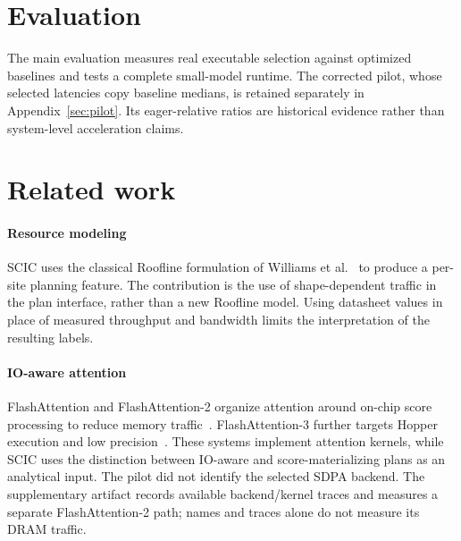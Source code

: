 \documentclass[a4paper,fleqn]{cas-dc}
\begin{document}




\section{Evaluation}
\label{sec:eval}

The main evaluation measures real executable selection against optimized baselines and tests a complete small-model runtime.
The corrected pilot, whose selected latencies copy baseline medians, is retained separately in Appendix~\ref{sec:pilot}.
Its eager-relative ratios are historical evidence rather than system-level acceleration claims.





\section{Related work}
\label{sec:related}

\paragraph{Resource modeling}
SCIC uses the classical Roofline formulation of Williams et al.~\cite{Williams2009Roofline} to produce a per-site planning feature.
The contribution is the use of shape-dependent traffic in the plan interface, rather than a new Roofline model.
Using datasheet values in place of measured throughput and bandwidth limits the interpretation of the resulting labels.

\paragraph{IO-aware attention}
FlashAttention and FlashAttention-2 organize attention around on-chip score processing to reduce memory traffic~\cite{Dao2022FlashAttention,Dao2023FlashAttention2}.
FlashAttention-3 further targets Hopper execution and low precision~\cite{Shah2024FlashAttention3}.
These systems implement attention kernels, while SCIC uses the distinction between IO-aware and score-materializing plans as an analytical input.
The pilot did not identify the selected SDPA backend. The supplementary artifact records available backend/kernel traces and measures a separate FlashAttention-2 path; names and traces alone do not measure its DRAM traffic.
\end{document}
